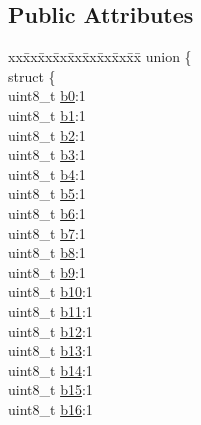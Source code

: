 \subsection*{Public Attributes}
\begin{DoxyCompactItemize}
\item 
\begin{tabbing}
xx\=xx\=xx\=xx\=xx\=xx\=xx\=xx\=xx\=\kill
union \{\\
\>struct \{\\
\>\>uint8\_t \hyperlink{struct_b_o_o_l32_a695f2ea79d7f3143cefe5391ee1ca0bc}{b0}:1\\
\>\>uint8\_t \hyperlink{struct_b_o_o_l32_a7e9669f351570749facee83d076f9bc0}{b1}:1\\
\>\>uint8\_t \hyperlink{struct_b_o_o_l32_a640276807605e096aad087624eb203d6}{b2}:1\\
\>\>uint8\_t \hyperlink{struct_b_o_o_l32_a480f658333eb1eed7f831bd4d36beeb5}{b3}:1\\
\>\>uint8\_t \hyperlink{struct_b_o_o_l32_abe1252ff43beedc42e030a2186f52de7}{b4}:1\\
\>\>uint8\_t \hyperlink{struct_b_o_o_l32_a399fa4b7132061ae10294e80a53a2829}{b5}:1\\
\>\>uint8\_t \hyperlink{struct_b_o_o_l32_a261bb3f36714d66a0f49af0fc2aff1a3}{b6}:1\\
\>\>uint8\_t \hyperlink{struct_b_o_o_l32_a8b6f23bb5831d6e4da5efd5ffbfabfef}{b7}:1\\
\>\>uint8\_t \hyperlink{struct_b_o_o_l32_a8904bddd286d03287c00c64ce331cfec}{b8}:1\\
\>\>uint8\_t \hyperlink{struct_b_o_o_l32_aa20759c864674ee2b2b5370a5eac753d}{b9}:1\\
\>\>uint8\_t \hyperlink{struct_b_o_o_l32_a405fbb96cd9be504fc3ad6b46d663ed0}{b10}:1\\
\>\>uint8\_t \hyperlink{struct_b_o_o_l32_abb5f609784efd1ce95411de3dc711256}{b11}:1\\
\>\>uint8\_t \hyperlink{struct_b_o_o_l32_a94c02cc91134cb40f4891f99991c0169}{b12}:1\\
\>\>uint8\_t \hyperlink{struct_b_o_o_l32_aa9b6491afa3cb93436211ead5dd72757}{b13}:1\\
\>\>uint8\_t \hyperlink{struct_b_o_o_l32_a1dc97f98eebbfbba891b0685d80530a0}{b14}:1\\
\>\>uint8\_t \hyperlink{struct_b_o_o_l32_aa8c7112f2b0e1a8cc5ce8f9539b7d245}{b15}:1\\
\>\>uint8\_t \hyperlink{struct_b_o_o_l32_a6e5640d7a5ba9ece502f2b5b9a2349c3}{b16}:1\\

\end{tabbing}
\end{DoxyCompactItemize}
